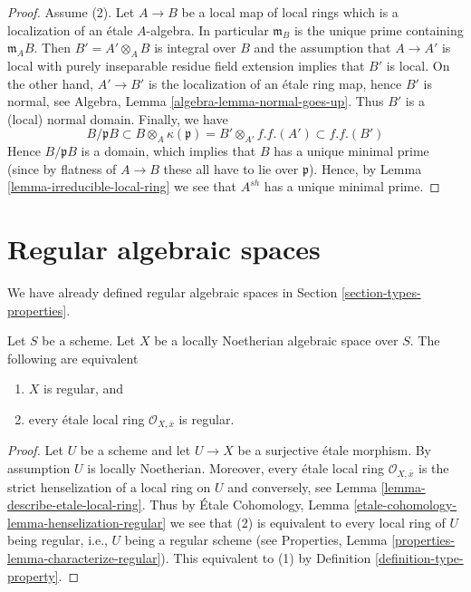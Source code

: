 \begin{proof}
\medskip\noindent
Assume (2). Let $A \to B$ be a local map of local rings which is a
localization of an \'etale $A$-algebra. In particular $\mathfrak m_B$
is the unique prime containing $\mathfrak m_AB$. Then $B' = A' \otimes_A B$
is integral over $B$ and the assumption that $A \to A'$ is local
with purely inseparable residue field extension implies that $B'$
is local. On the other hand, $A' \to B'$ is the localization
of an \'etale ring map, hence $B'$ is normal, see
Algebra, Lemma \ref{algebra-lemma-normal-goes-up}.
Thus $B'$ is a (local) normal domain. Finally, we have
$$
B/\mathfrak pB \subset B \otimes_A \kappa(\mathfrak p)
= B' \otimes_{A'} f.f.(A') \subset f.f.(B')
$$
Hence $B/\mathfrak pB$ is a domain, which implies that $B$ has a unique
minimal prime (since by flatness of $A \to B$ these all have to lie
over $\mathfrak p$). Hence, by
Lemma \ref{lemma-irreducible-local-ring}
we see that $A^{sh}$ has a unique minimal prime.
\end{proof}








\section{Regular algebraic spaces}
\label{section-regular}

\noindent
We have already defined regular algebraic spaces in
Section \ref{section-types-properties}.

\begin{lemma}
\label{lemma-regular}
Let $S$ be a scheme.
Let $X$ be a locally Noetherian algebraic space over $S$.
The following are equivalent
\begin{enumerate}
\item $X$ is regular, and
\item every \'etale local ring $\mathcal{O}_{X, \overline{x}}$ is
regular.
\end{enumerate}
\end{lemma}

\begin{proof}
Let $U$ be a scheme and let $U \to X$ be a surjective \'etale morphism.
By assumption $U$ is locally Noetherian. Moreover, every \'etale local
ring $\mathcal{O}_{X, \overline{x}}$ is the strict henselization of
a local ring on $U$ and conversely, see
Lemma \ref{lemma-describe-etale-local-ring}.
Thus by
\'Etale Cohomology, Lemma \ref{etale-cohomology-lemma-henselization-regular}
we see that (2) is equivalent to every local ring of $U$ being
regular, i.e., $U$ being a regular scheme (see
Properties, Lemma \ref{properties-lemma-characterize-regular}).
This equivalent to (1) by
Definition \ref{definition-type-property}.
\end{proof}







